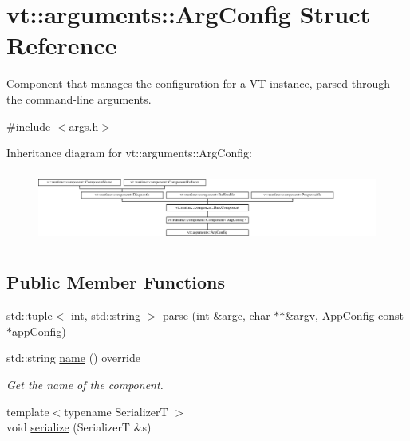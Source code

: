 \hypertarget{structvt_1_1arguments_1_1_arg_config}{}\section{vt\+:\+:arguments\+:\+:Arg\+Config Struct Reference}
\label{structvt_1_1arguments_1_1_arg_config}


Component that manages the configuration for a VT instance, parsed through the command-\/line arguments.  




{\ttfamily \#include $<$args.\+h$>$}

Inheritance diagram for vt\+:\+:arguments\+:\+:Arg\+Config\+:\begin{figure}[H]
\begin{center}
\leavevmode
\includegraphics[height=2.372881cm]{structvt_1_1arguments_1_1_arg_config}
\end{center}
\end{figure}
\subsection*{Public Member Functions}
\begin{DoxyCompactItemize}
\item 
std\+::tuple$<$ int, std\+::string $>$ \hyperlink{structvt_1_1arguments_1_1_arg_config_a56183006ac2bce88c5cda3d2716a1e2d}{parse} (int \&argc, char $\ast$$\ast$\&argv, \hyperlink{structvt_1_1arguments_1_1_app_config}{App\+Config} const $\ast$app\+Config)
\item 
std\+::string \hyperlink{structvt_1_1arguments_1_1_arg_config_ade5e5994235f0953970fc3f460f9167a}{name} () override
\begin{DoxyCompactList}\small\item\em Get the name of the component. \end{DoxyCompactList}\item 
{\footnotesize template$<$typename SerializerT $>$ }\\void \hyperlink{structvt_1_1arguments_1_1_arg_config_a518d54185e265211ff1ed9aac08a868d}{serialize} (SerializerT \&s)
\end{DoxyCompactItemize}
